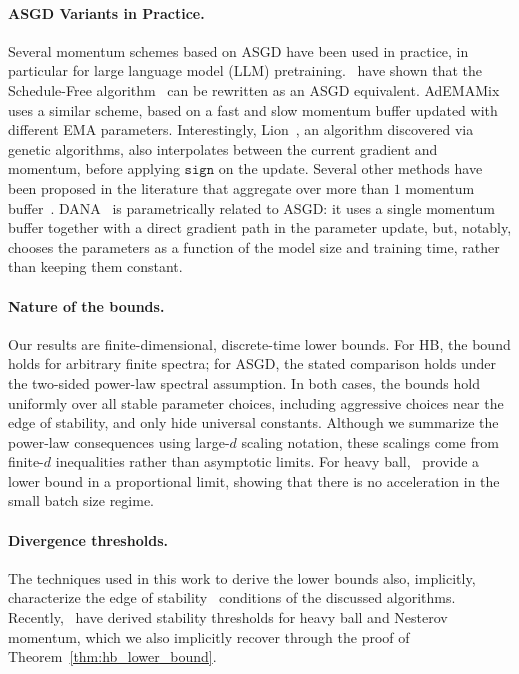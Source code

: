 \documentclass{article}
\begin{document}
\paragraph{ASGD Variants in Practice.} Several momentum schemes based on ASGD have been used in practice, in particular for large language model (LLM) pretraining.~\citet{morwani2025connections} have shown that the Schedule-Free algorithm~\citep{defazio2024road} can be rewritten as an ASGD equivalent. AdEMAMix~\citep{pagliardini2024ademamix} uses a similar scheme, based on a fast and slow momentum buffer updated with different EMA parameters. Interestingly, Lion~\citep{chen2023symbolic}, an algorithm discovered via genetic algorithms, also interpolates between the current gradient and momentum, before applying $\mathtt{sign}$ on the update. Several other methods have been proposed in the literature that aggregate over more than $1$ momentum buffer~\citep{lucas2018aggregated,ma2018quasi}. DANA~\citep{ferbach2025dimension,bordelon2026theory} is parametrically related to ASGD:
it uses a single momentum buffer together with a direct gradient path in
the parameter update, but, notably, chooses the parameters as a function of the model size and training time, rather than keeping them constant.

\paragraph{Nature of the bounds.}
Our results are finite-dimensional, discrete-time lower bounds. For HB, the
bound holds for arbitrary finite spectra; for ASGD, the stated comparison holds
under the two-sided power-law spectral assumption. In both cases, the bounds
hold uniformly over all stable parameter choices, including aggressive choices
near the edge of stability, and only hide universal constants. Although we
summarize the power-law consequences using large-\(d\) scaling notation, these
scalings come from finite-\(d\) inequalities rather than asymptotic limits. For heavy ball,~\citet{lee2022trajectory} provide a lower bound in a proportional limit, showing that there is no acceleration in the small batch size regime.

\paragraph{Divergence thresholds.} The techniques used in this work to derive the lower bounds also, implicitly, characterize the edge of stability~\citep{cohen2021gradient, cohen2022adaptive} conditions of the discussed algorithms. Recently,~\citet{andreyev2026momentum} have derived stability thresholds for heavy ball and Nesterov momentum, which we also implicitly recover through the proof of Theorem~\ref{thm:hb_lower_bound}.
\end{document}
